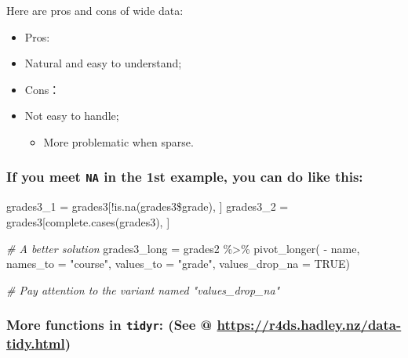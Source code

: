 \documentclass[
]{article}
\newenvironment{Shaded}{}{}
\newcommand{\AttributeTok}[1]{\textcolor[rgb]{0.49,0.56,0.16}{#1}}
\newcommand{\CommentTok}[1]{\textcolor[rgb]{0.38,0.63,0.69}{\textit{#1}}}
\newcommand{\ConstantTok}[1]{\textcolor[rgb]{0.53,0.00,0.00}{#1}}
\newcommand{\FunctionTok}[1]{\textcolor[rgb]{0.02,0.16,0.49}{#1}}
\newcommand{\NormalTok}[1]{#1}
\newcommand{\OtherTok}[1]{\textcolor[rgb]{0.00,0.44,0.13}{#1}}
\newcommand{\SpecialCharTok}[1]{\textcolor[rgb]{0.25,0.44,0.63}{#1}}
\newcommand{\StringTok}[1]{\textcolor[rgb]{0.25,0.44,0.63}{#1}}
\begin{document}
Here are pros and cons of wide data:

\begin{itemize}
\item
  Pros:
\item
  Natural and easy to understand;
\item
  Cons：
\item
  Not easy to handle;

  \begin{itemize}
  \item
    More problematic when sparse.
  \end{itemize}
\end{itemize}

\hypertarget{if-you-meet-na-in-the-1st-example-you-can-do-like-this}{%
\subsubsection{\texorpdfstring{If you meet \texttt{NA} in the 1st
example, you can do like
this:}{If you meet NA in the 1st example, you can do like this:}}\label{if-you-meet-na-in-the-1st-example-you-can-do-like-this}}

\begin{Shaded}
\begin{Highlighting}[]
\NormalTok{grades3\_1 }\OtherTok{=}
\NormalTok{	grades3[}\SpecialCharTok{!}\FunctionTok{is.na}\NormalTok{(grades3}\SpecialCharTok{\$}\NormalTok{grade), ]}
\NormalTok{grades3\_2 }\OtherTok{=}
\NormalTok{	grades3[}\FunctionTok{complete.cases}\NormalTok{(grades3), ]}

\CommentTok{\# A better solution}
\NormalTok{grades3\_long }\OtherTok{=}\NormalTok{ grades2 }\SpecialCharTok{\%\textgreater{}\%} 
  \FunctionTok{pivot\_longer}\NormalTok{( }\SpecialCharTok{{-}}\NormalTok{ name, }
                \AttributeTok{names\_to =} \StringTok{"course"}\NormalTok{, }
                \AttributeTok{values\_to =} \StringTok{"grade"}\NormalTok{,}
                \AttributeTok{values\_drop\_na =} \ConstantTok{TRUE}\NormalTok{)}

\CommentTok{\# Pay attention to the variant named "values\_drop\_na"}
\end{Highlighting}
\end{Shaded}

\hypertarget{more-functions-in-tidyr-see--httpsr4dshadleynzdata-tidyhtml}{%
\subsubsection{\texorpdfstring{More functions in \texttt{tidyr}: (See @
\url{https://r4ds.hadley.nz/data-tidy.html})}{More functions in tidyr: (See @ https://r4ds.hadley.nz/data-tidy.html)}}\label{more-functions-in-tidyr-see--httpsr4dshadleynzdata-tidyhtml}}
\end{document}
